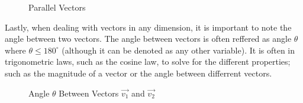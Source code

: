 \documentclass[12.5pt]{article}
\begin{document}
\begin{flushleft}
            \begin{figure}[h]
                    \centering
                    \caption{Parallel Vectors}
            \end{figure}

            Lastly, when dealing with vectors in any dimension, it is important to note the angle between two vectors. The 
            angle between vectors is often reffered as angle $\theta$ where $\theta \le 180^{\circ}$ (although it can be denoted as any other variable). It is often
            in trigonometric laws, such as the cosine law, to solve for the different properties; such as the magnitude of a vector
            or the angle between differrent vectors.

            \begin{figure}[h]
                    \centering
                    \caption{Angle $\theta$ Between Vectors $\vec{v_1}$ and $\vec{v_2}$}
            \end{figure} 

        \end{flushleft}
        \clearpage
\end{document}
